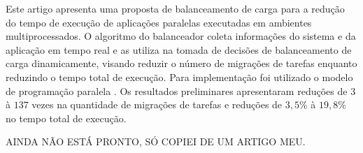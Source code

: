 \setlength{\absparsep}{18pt} %
\begin{resumo}
Este artigo apresenta uma proposta de balanceamento de carga para a redução do tempo de execução de aplicações paralelas executadas em ambientes multiprocessados.
O algoritmo do balanceador coleta informações do sistema e da aplicação em tempo real e as utiliza na tomada de decisões de balanceamento de carga dinamicamente, visando reduzir o número de migrações de tarefas enquanto reduzindo o tempo total de execução.  
Para implementação foi utilizado o modelo de programação paralela \charm. 
Os resultados preliminares apresentaram reduções de $3$ à $137$ vezes na quantidade de migrações de tarefas e reduções de $3,5$\% à $19,8$\% no tempo total de execução.	

AINDA NÃO ESTÁ PRONTO, SÓ COPIEI DE UM ARTIGO MEU.
\end{resumo}